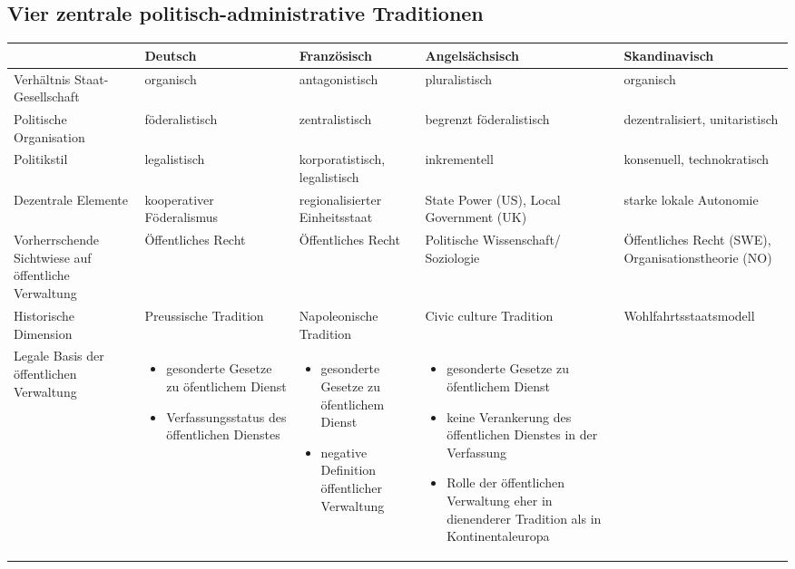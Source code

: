 \begin{landscape}

\chapter{Vier zentrale politisch-administrative Traditionen}	
\begin{table}[!hbt]\tiny
\begin{tabular}{|p{4cm}|p{5cm}|p{5cm}|p{5cm}|p{4cm}|}\hline
\vspace{3mm}
&\textbf {\normalsize Deutsch}&	\textbf{\normalsize Französisch}&\textbf {\normalsize Angelsächsisch}&	\textbf{\normalsize Skandinavisch}\\\hline
Verhältnis Staat-Gesellschaft&	organisch&	antagonistisch&	pluralistisch&	organisch\\\hline
Politische Organisation&föderalistisch&zentralistisch	&begrenzt föderalistisch&dezentralisiert, unitaristisch\\\hline
Politikstil&	legalistisch	&korporatistisch, legalistisch&	inkrementell&	konsenuell, technokratisch\\\hline
Dezentrale Elemente&	kooperativer Föderalismus&	regionalisierter Einheitsstaat&	State Power (US), Local Government (UK)&	starke lokale Autonomie\\\hline
Vorherrschende Sichtwiese auf öffentliche Verwaltung&	Öffentliches Recht	&Öffentliches Recht&	Politische Wissenschaft/ Soziologie	&Öffentliches Recht (SWE), Organisationstheorie (NO)\\\hline
Historische Dimension&	Preussische Tradition	&Napoleonische Tradition&	Civic culture Tradition&	Wohlfahrtsstaatsmodell\\\hline
Legale Basis der öffentlichen Verwaltung
&
\begin{itemize}[leftmargin=*]
\item gesonderte Gesetze zu öfentlichem Dienst
\item Verfassungsstatus des öffentlichen Dienstes
\end{itemize}
&
\begin{itemize}[leftmargin=*]
\item gesonderte Gesetze zu öfentlichem Dienst            
\item negative Definition öffentlicher Verwaltung 
\end{itemize}
&
 \vspace{-3mm}
\begin{itemize}[leftmargin=*]
\item gesonderte Gesetze zu öfentlichem Dienst
\item keine Verankerung des öffentlichen Dienstes in der Verfassung
\item Rolle der öffentlichen Verwaltung eher in dienenderer Tradition als in Kontinentaleuropa
 \vspace{-3mm}
 \end{itemize}


\end{tabular}
\end{table}
\end{landscape}
